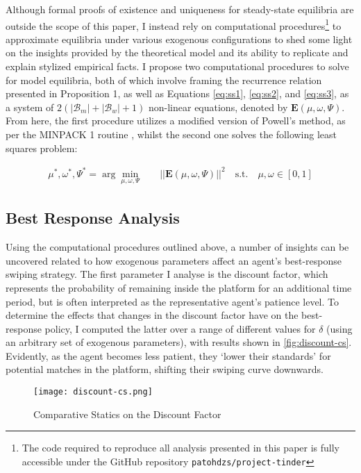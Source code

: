 Although formal proofs of existence and uniqueness for steady-state equilibria are outside the scope of this paper, I instead rely on computational procedures\footnote{The code required to reproduce all analysis presented in this paper is fully accessible under the GitHub repository \texttt{patohdzs/project-tinder}} to approximate equilibria under various exogenous configurations to shed some light on the insights provided by the theoretical model and its ability to replicate and explain stylized empirical facts. I propose two computational procedures to solve for model equilibria, both of which involve framing the recurrence relation presented in Proposition 1, as well as Equations \ref{eq:ss1}, \ref{eq:ss2}, and \ref{eq:ss3}, as a system of $2(|\mathcal{B}_m|+|\mathcal{B}_w|+1)$ non-linear equations, denoted by $\mathbf{E}(\mu,\omega,\Psi)$. From here, the first procedure utilizes a modified version of Powell's method, as per the MINPACK 1 routine \citep{more1980user}, whilst the second one solves the following least squares problem:

\begin{equation*}
    \begin{split} 
        \mu^*, \omega^*, \Psi^* = \arg\min_{\mu,\omega,\Psi} \quad &  ||\mathbf{E}(\mu,\omega,\Psi)||^2 \quad \textrm{s.t.} \quad  \mu, \omega  \in [0,1] 
    \end{split}
\end{equation*}
 

\subsection{Best Response Analysis}\label{sec:section3.2} 
Using the computational procedures outlined above, a number of insights can be uncovered related to how exogenous parameters affect an agent's best-response swiping strategy. The first parameter I analyse is the discount factor, which represents the probability of remaining inside the platform for an additional time period, but is often interpreted as the representative agent's patience level. To determine the effects that changes in the discount factor have on the best-response policy, I computed the latter over a range of different values for $\delta$ (using an arbitrary set of exogenous parameters), with results shown in \autoref{fig:discount-cs}. Evidently, as the agent becomes less patient, they `lower their standards' for potential matches in the platform, shifting their swiping curve downwards. 

\begin{figure}[ht] 
    \centering
    \caption{Comparative Statics on the Discount Factor}
    \texttt{[image: discount-cs.png]}
    \label{fig:discount-cs}
\end{figure}

